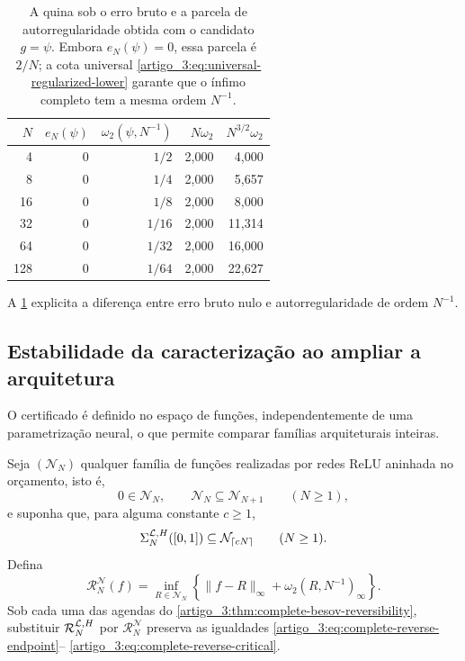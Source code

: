 \begin{table}[t]
 \centering
\caption{A quina sob o erro bruto e a parcela de autorregularidade obtida
 com o candidato $g=\psi$. Embora $e_N(\psi)=0$, essa parcela é $2/N$; a
 cota universal \eqref{artigo_3:eq:universal-regularized-lower} garante que o ínfimo
 completo tem a mesma ordem $N^{-1}$.}\label{artigo_3:tab:kink-regularized-certificate}
\small
 \begin{tabular}{rrrrr}
\toprule
$N$ & $e_N(\psi)$ & $\omega_2(\psi,N^{-1})$ & $N\omega_2$ & $N^{3/2}\omega_2$\\
\midrule
4 & 0 & $1/2$ & 2{,}000 & 4{,}000\\
8 & 0 & $1/4$ & 2{,}000 & 5{,}657\\
16 & 0 & $1/8$ & 2{,}000 & 8{,}000\\
32 & 0 & $1/16$ & 2{,}000 & 11{,}314\\
64 & 0 & $1/32$ & 2{,}000 & 16{,}000\\
128 & 0 & $1/64$ & 2{,}000 & 22{,}627\\
\bottomrule
\end{tabular}
\end{table}

A \cref{artigo_3:tab:kink-regularized-certificate} explicita a diferença entre
erro bruto nulo e autorregularidade de ordem $N^{-1}$.

\subsection{Estabilidade da caracterização ao ampliar a arquitetura}

O certificado é definido no espaço de funções, independentemente de uma
parametrização neural, o que permite comparar famílias arquiteturais inteiras.

\begin{theorem}\label{map:artigo_3:5.14}
\label{artigo_3:thm:architecture-stable-reversibility}
Seja $(\mathcal N_N)$ qualquer família de funções realizadas por redes ReLU
aninhada no orçamento, isto é,
\begin{equation}
 0\in\mathcal N_N,
 \qquad \mathcal N_N\subseteq\mathcal N_{N+1}
 \qquad(N\ge1),
 \label{artigo_3:eq:network-family-nesting}
\end{equation}
e suponha que, para alguma constante $c\ge1$,
\begin{equation}
 \Sigma_N^{\mathcal{L},H}([0,1])\subseteq\mathcal N_{\lceil cN\rceil}
 \qquad(N\ge1).
 \label{artigo_3:eq:network-family-contains-library}
\end{equation}
Defina
\begin{equation}
 \mathcal R_N^{\mathcal N}(f)
 =\inf_{R\in\mathcal N_N}
 \left\{\|f-R\|_\infty+\omega_2(R,N^{-1})_\infty\right\}.
 \label{artigo_3:eq:network-regularized-certificate}
\end{equation}
Sob cada uma das agendas do
\cref{artigo_3:thm:complete-besov-reversibility}, substituir
$\mathcal R_N^{\mathcal{L},H}$ por $\mathcal R_N^{\mathcal N}$ preserva as
igualdades \eqref{artigo_3:eq:complete-reverse-endpoint}--
\eqref{artigo_3:eq:complete-reverse-critical}.
\end{theorem}

